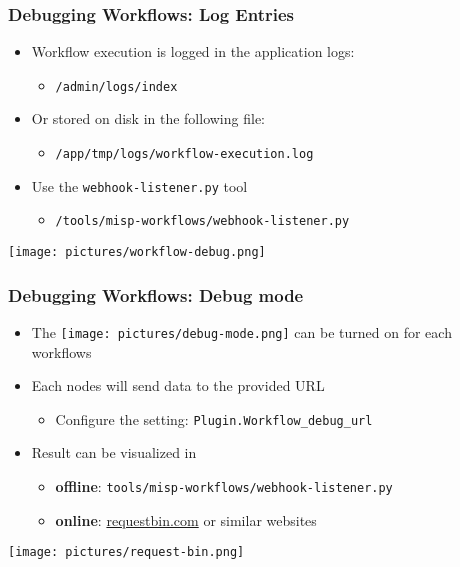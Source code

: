 \begin{frame}
    \frametitle{Debugging Workflows: Log Entries}
    \begin{itemize}
        \item Workflow execution is logged in the application logs:
        \begin{itemize}
            \item \texttt{/admin/logs/index}
        \end{itemize}
        \item Or stored on disk in the following file:
        \begin{itemize}
            \item \texttt{/app/tmp/logs/workflow-execution.log}
        \end{itemize}
        \item Use the \texttt{webhook-listener.py} tool
        \begin{itemize}
            \item \texttt{/tools/misp-workflows/webhook-listener.py}
        \end{itemize}
    \end{itemize}
    \begin{center}
        \texttt{[image: pictures/workflow-debug.png]}
    \end{center}
\end{frame}

\begin{frame}
    \frametitle{Debugging Workflows: Debug mode}
    \begin{itemize}
        \item The \texttt{[image: pictures/debug-mode.png]} can be turned on for each workflows
        \item Each nodes will send data to the provided URL
        \begin{itemize}
            \item Configure the setting: \texttt{Plugin.Workflow\_debug\_url}
        \end{itemize}
        \item Result can be visualized in
        \begin{itemize}
            \item \textbf{offline}: \texttt{tools/misp-workflows/webhook-listener.py}
            \item \textbf{online}: \url{requestbin.com} or similar websites
        \end{itemize}
    \end{itemize}
    \begin{center}
        \texttt{[image: pictures/request-bin.png]}
    \end{center}
\end{frame}

